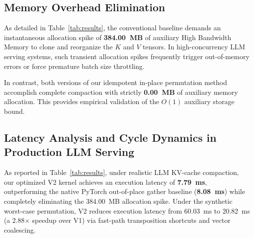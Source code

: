 \documentclass[journal,10pt,twocolumn]{article}
\begin{document}
\begin{table}[t]
\centering
\caption{Empirical Hardware Compaction Performance Comparison on NVIDIA Blackwell Architecture (\texttt{sm\_120})}
\label{tab:results}
\end{table}

\subsection{Memory Overhead Elimination}
As detailed in Table~\ref{tab:results}, the conventional baseline demands an instantaneous allocation spike of \textbf{384.00~MB} of auxiliary High Bandwidth Memory to clone and reorganize the $K$ and $V$ tensors. In high-concurrency LLM serving systems, such transient allocation spikes frequently trigger out-of-memory errors or force premature batch size throttling.

In contrast, both versions of our idempotent in-place permutation method accomplish complete compaction with strictly \textbf{0.00~MB} of auxiliary memory allocation. This provides empirical validation of the $O(1)$ auxiliary storage bound.

\subsection{Latency Analysis and Cycle Dynamics in Production LLM Serving}
\label{sec:latency_eval}
As reported in Table~\ref{tab:results}, under realistic LLM KV-cache compaction, our optimized V2 kernel achieves an execution latency of \textbf{7.79~ms}, outperforming the native PyTorch out-of-place gather baseline (\textbf{8.08~ms}) while completely eliminating the 384.00~MB allocation spike. Under the synthetic worst-case permutation, V2 reduces execution latency from 60.03~ms to 20.82~ms (a 2.88$\times$ speedup over V1) via fast-path transposition shortcuts and vector coalescing.
\end{document}

